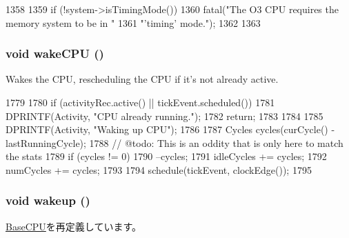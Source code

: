 \begin{DoxyCode}
1358 {
1359     if (!system->isTimingMode()) {
1360         fatal("The O3 CPU requires the memory system to be in "
1361               "'timing' mode.\n");
1362     }
1363 }
\end{DoxyCode}
\hypertarget{classFullO3CPU_abce3a63b123f84972e4df7962f9b870e}{
\subsubsection[{wakeCPU}]{\setlength{\rightskip}{0pt plus 5cm}void wakeCPU ()}}
\label{classFullO3CPU_abce3a63b123f84972e4df7962f9b870e}
Wakes the CPU, rescheduling the CPU if it's not already active. 


\begin{DoxyCode}
1779 {
1780     if (activityRec.active() || tickEvent.scheduled()) {
1781         DPRINTF(Activity, "CPU already running.\n");
1782         return;
1783     }
1784 
1785     DPRINTF(Activity, "Waking up CPU\n");
1786 
1787     Cycles cycles(curCycle() - lastRunningCycle);
1788     // @todo: This is an oddity that is only here to match the stats
1789     if (cycles != 0)
1790         --cycles;
1791     idleCycles += cycles;
1792     numCycles += cycles;
1793 
1794     schedule(tickEvent, clockEdge());
1795 }
\end{DoxyCode}
\hypertarget{classFullO3CPU_ae674290a26ecbd622c5160e38e8a4fe9}{
\subsubsection[{wakeup}]{\setlength{\rightskip}{0pt plus 5cm}void wakeup ()}}
\label{classFullO3CPU_ae674290a26ecbd622c5160e38e8a4fe9}


\hyperlink{classBaseCPU_a75101f8aee74078c8c3c1d1f3617f7cc}{BaseCPU}を再定義しています。


